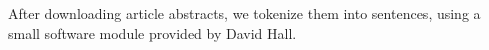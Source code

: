 After downloading article abstracts, we tokenize them into sentences, using a small software
module provided by David Hall.
